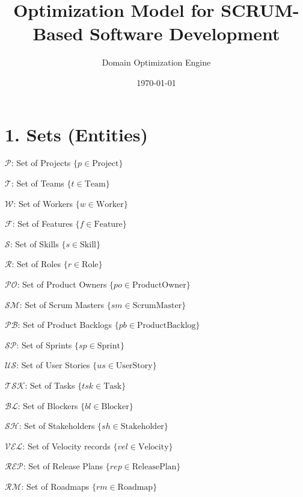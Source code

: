 \documentclass[12pt]{article}
\title{Optimization Model for SCRUM-Based Software Development}
\author{Domain Optimization Engine}
\date{\today}
\begin{document}
\maketitle
\tableofcontents
\newpage

\section{1. Sets (Entities)}
\item $ \mathcal{P} $: Set of Projects $ \{ p \in \text{Project} \} $
    \item $ \mathcal{T} $: Set of Teams $ \{ t \in \text{Team} \} $
    \item $ \mathcal{W} $: Set of Workers $ \{ w \in \text{Worker} \} $
    \item $ \mathcal{F} $: Set of Features $ \{ f \in \text{Feature} \} $
    \item $ \mathcal{S} $: Set of Skills $ \{ s \in \text{Skill} \} $
    \item $ \mathcal{R} $: Set of Roles $ \{ r \in \text{Role} \} $
    \item $ \mathcal{PO} $: Set of Product Owners $ \{ po \in \text{ProductOwner} \} $
    \item $ \mathcal{SM} $: Set of Scrum Masters $ \{ sm \in \text{ScrumMaster} \} $
    \item $ \mathcal{PB} $: Set of Product Backlogs $ \{ pb \in \text{ProductBacklog} \} $
    \item $ \mathcal{SP} $: Set of Sprints $ \{ sp \in \text{Sprint} \} $
    \item $ \mathcal{US} $: Set of User Stories $ \{ us \in \text{UserStory} \} $
    \item $ \mathcal{TSK} $: Set of Tasks $ \{ tsk \in \text{Task} \} $
    \item $ \mathcal{BL} $: Set of Blockers $ \{ bl \in \text{Blocker} \} $
    \item $ \mathcal{SH} $: Set of Stakeholders $ \{ sh \in \text{Stakeholder} \} $
    \item $ \mathcal{VEL} $: Set of Velocity records $ \{ vel \in \text{Velocity} \} $
    \item $ \mathcal{REP} $: Set of Release Plans $ \{ rep \in \text{ReleasePlan} \} $
    \item $ \mathcal{RM} $: Set of Roadmaps $ \{ rm \in \text{Roadmap} \} $
\end{document}
